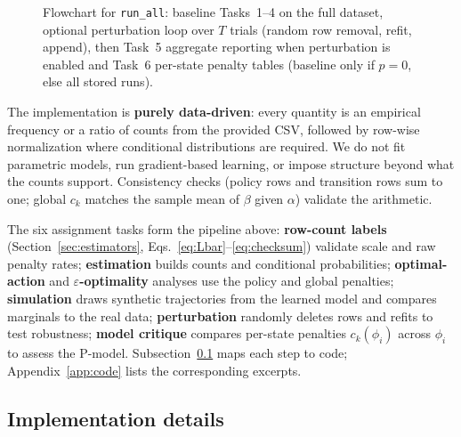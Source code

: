 \documentclass[11pt,a4paper]{article}
\begin{document}
\begin{figure}[htbp]
{%
  }
  \caption{Flowchart for \texttt{run\_all}: baseline Tasks~1--4 on the full dataset,
    optional perturbation loop over $T$ trials (random row removal, refit, append),
    then Task~5 aggregate reporting when perturbation is enabled and Task~6
    per-state penalty tables (baseline only if $p=0$, else all stored runs).}
  \label{fig:flow}
\end{figure}

The implementation is \textbf{purely data-driven}: every quantity is an empirical
frequency or a ratio of counts from the provided CSV, followed by row-wise
normalization where conditional distributions are required. We do not fit
parametric models, run gradient-based learning, or impose structure beyond what
the counts support. Consistency checks (policy rows and transition rows sum to
one; global $c_k$ matches the sample mean of $\beta$ given $\alpha$) validate
the arithmetic.

The six assignment tasks form the pipeline above: \textbf{row-count labels}
(Section~\ref{sec:estimators}, Eqs.~\eqref{eq:Lbar}--\eqref{eq:checksum})
validate scale and raw penalty rates;
\textbf{estimation} builds counts and conditional probabilities;
\textbf{optimal-action} and \textbf{$\varepsilon$-optimality} analyses use the
policy and global penalties; \textbf{simulation} draws synthetic trajectories
from the learned model and compares marginals to the real data;
\textbf{perturbation} randomly deletes rows and refits to test robustness;
\textbf{model critique} compares per-state penalties $c_k(\phi_i)$ across
$\phi_i$ to assess the P-model.
Subsection~\ref{sec:implementation} maps each step to code; Appendix~\ref{app:code}
lists the corresponding excerpts.

\subsection{Implementation details}\label{sec:implementation}
\sloppy
\end{document}
